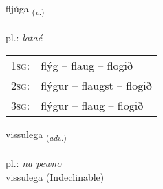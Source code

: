 \documentclass[frontgrid, backgrid]{flacards}\usepackage[]{graphicx}\usepackage[]{xcolor}
\begin{document}
\renewcommand{\flhead}{\vskip5pt \fboxsep=0pt {\small\bfseries\footnotesize Sagnorð | czasownik}}
\renewcommand{\fcfoot}{\vskip5pt \fboxsep=0pt \hspace{2pt}{\small\bfseries\footnotesize 1K}}

\renewcommand{\blhead}{\vskip5pt {\small\bfseries\footnotesize Sagnorð | czasownik }}
\renewcommand{\bcfoot}{\vskip5pt \hspace{2pt}{\small\bfseries\footnotesize 1K}}


{fljúga \small{\textsubscript{(\textit{v.})}} \\[1ex] %
\textphonetic{[fljuːɣa]} \\
pl.: \emph{latać} \\  [2ex]
\renewcommand*{\arraystretch}{0.8}
\begin{tabular}{p{1cm}l}
\textsc{1sg}: & flýg -- flaug -- flogið \\ 
\textsc{2sg}: & flýgur -- flaugst -- flogið \\ 
\textsc{3sg}: & flýgur -- flaug -- flogið \\ 
\end{tabular}
}


\renewcommand{\flhead}{\vskip5pt \fboxsep=0pt {\small\bfseries\footnotesize Atviksorð | przysłówek}}
\renewcommand{\fcfoot}{\vskip5pt \fboxsep=0pt \hspace{2pt}{\small\bfseries\footnotesize 1K}}

\renewcommand{\blhead}{\vskip5pt {\small\bfseries\footnotesize Atviksorð | przysłówek }}
\renewcommand{\bcfoot}{\vskip5pt \hspace{2pt}{\small\bfseries\footnotesize 1K}}


{vissulega \small{\textsubscript{(\textit{adv.})}} \\[1ex]
\textphonetic{[vɪsʏlɛɣa]} \\
pl.: \emph{na pewno} \\  [2ex]
vissulega (Indeclinable)}
\end{document}
